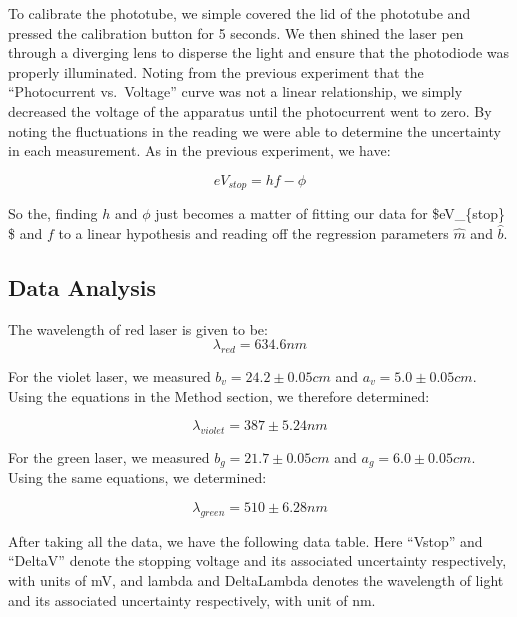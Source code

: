 \documentclass[11pt]{article}
\begin{document}
To calibrate the phototube, we simple covered the lid of the phototube
and pressed the calibration button for 5 seconds. We then shined the
laser pen through a diverging lens to disperse the light and ensure that
the photodiode was properly illuminated. Noting from the previous
experiment that the ``Photocurrent vs.~Voltage'' curve was not a linear
relationship, we simply decreased the voltage of the apparatus until the
photocurrent went to zero. By noting the fluctuations in the reading we
were able to determine the uncertainty in each measurement. As in the
previous experiment, we have:

\[eV_{stop} = hf - \phi\]

So the, finding \(h\) and \(\phi\) just becomes a matter of fitting our
data for \$eV\_\{stop\} \$ and \(f\) to a linear hypothesis and reading
off the regression parameters \(\hat{m}\) and \(\hat{b}\).

    \hypertarget{data-analysis}{%
\subsection{Data Analysis}\label{data-analysis}}

The wavelength of red laser is given to be: \[\lambda_{red}=634.6nm\]

For the violet laser, we measured \(b_{v}=24.2\pm0.05cm\) and
\(a_{v}=5.0\pm0.05cm\). Using the equations in the Method section, we
therefore determined:

\[\lambda_{violet} = 387\pm5.24nm\]

For the green laser, we measured \(b_{g}=21.7\pm0.05cm\) and
\(a_{g}=6.0\pm0.05cm\). Using the same equations, we determined:

\[\lambda_{green} = 510\pm6.28nm\]

After taking all the data, we have the following data table. Here
``Vstop'' and ``DeltaV'' denote the stopping voltage and its associated
uncertainty respectively, with units of mV, and lambda and DeltaLambda
denotes the wavelength of light and its associated uncertainty
respectively, with unit of nm.
\end{document}
